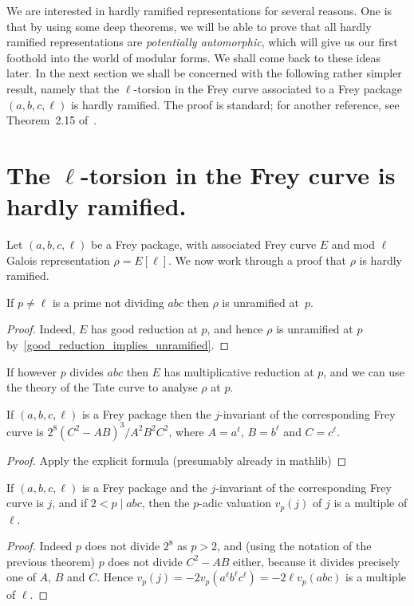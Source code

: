 We are interested in hardly ramified representations for several reasons. One is that by using some 
deep theorems, we will be able to prove that all hardly ramified representations are 
\emph{potentially automorphic}, which will give us our first foothold into the world of modular 
forms. We shall come back to these ideas later. In the next section we shall be concerned with
the following rather simpler result, namely that the $\ell$-torsion in the Frey curve
associated to a Frey package $(a,b,c,\ell)$ is hardly ramified. The proof is standard; 
for another reference, see Theorem~2.15 of~\cite{ddt}.

\section[The l-torsion in the Frey curve is hardly ramified.]{The $\ell$-torsion in the Frey curve is hardly ramified.}

Let $(a,b,c,\ell)$ be a Frey package, with associated Frey curve $E$ and mod $\ell$ Galois
 representation $\rho=E[\ell]$. We now work through a proof that $\rho$ is hardly ramified.

 \begin{theorem}\label{Frey_curve_good} If $p\not=\ell$ is a prime not dividing $abc$ then
  $\rho$ is unramified at~$p$.
 \end{theorem}
 \begin{proof} Indeed, $E$ has good reduction at $p$, and hence $\rho$ is unramified at $p$ 
  by~\ref{good_reduction_implies_unramified}. 
 \end{proof}

If however $p$ divides $abc$ then $E$ has multiplicative 
reduction at $p$, and we can use the theory of the Tate curve to analyse $\rho$ at $p$.

\begin{theorem}\label{Frey_curve_j} If $(a,b,c,\ell)$ is a Frey package then the $j$-invariant of the corresponding Frey curve is $2^8(C^2-AB)^3/A^2B^2C^2$, where $A=a^\ell$, $B=b^\ell$ and $C=c^\ell$.
\end{theorem}
\begin{proof}
  Apply the explicit formula (presumably already in mathlib)
\end{proof}

\begin{corollary}\label{Frey_curve_val_j} If $(a,b,c,\ell)$ is a Frey package and the $j$-invariant of the corresponding Frey curve is $j$, and if $2<p\mid abc$, then the $p$-adic valuation $v_p(j)$ of $j$ is a multiple of $\ell$.
\end{corollary}
\begin{proof} Indeed $p$ does not divide $2^8$ as $p>2$, and (using the notation of the previous theorem) $p$ does not divide $C^2-AB$ either, because it divides precisely one of $A$, $B$ and $C$. Hence $v_p(j)=-2v_p(a^\ell b^\ell c^\ell)=-2\ell v_p(abc)$ is a multiple of $\ell$.
\end{proof}

